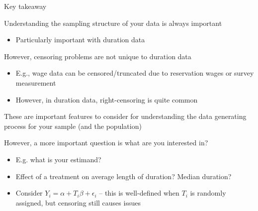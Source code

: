 \documentclass[notes,11pt, aspectratio=169]{beamer}
\newenvironment{wideitemize}{\itemize\addtolength{\itemsep}{10pt}}{\enditemize}
\begin{document}
\begin{frame}{Key takeaway}
  \begin{wideitemize}
  \item Understanding the sampling structure of your data is always important
    \begin{itemize}
    \item Particularly important with duration data
    \end{itemize}
  \item However, censoring problems are not unique to duration data
    \begin{itemize}
    \item E.g., wage data can be censored/truncated due to reservation wages or survey measurement
    \item However, in duration data, right-censoring is quite common 
    \end{itemize}
  \item These are important features to consider for understanding the data generating process for your sample (and the population)
  \item However, a more important question is what are you interested in?
    \begin{itemize}
    \item E.g. what is your estimand?
    \item Effect of a treatment on average length of duration? Median duration?
    \item Consider $Y_{i} = \alpha + T_{i}\beta + \epsilon_{i}$ --
      this is well-defined when $T_{i}$ is randomly assigned, but
      censoring still causes issues
    \end{itemize}
  \end{wideitemize}
\end{frame}
\end{document}
